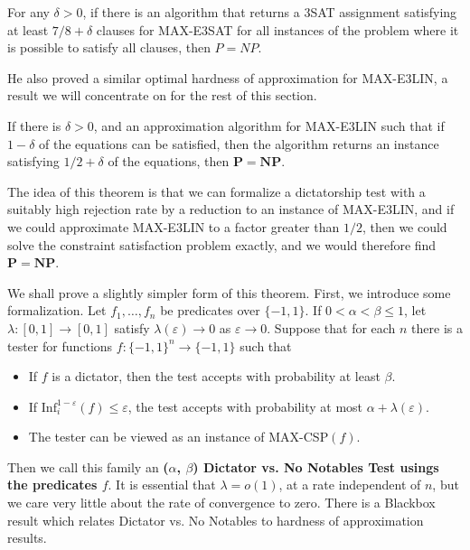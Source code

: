 \begin{theorem}[Hastad]
    For any $\delta > 0$, if there is an algorithm that returns a 3SAT assignment satisfying at least $7/8 + \delta$ clauses for MAX-E3SAT for all instances of the problem where it is possible to satisfy all clauses, then $P = NP$.
\end{theorem}

He also proved a similar optimal hardness of approximation for MAX-E3LIN, a result we will concentrate on for the rest of this section.

\begin{theorem}[Hastad]
    If there is $\delta > 0$, and an approximation algorithm for MAX-E3LIN such that if $1 - \delta$ of the equations can be satisfied, then the algorithm returns an instance satisfying $1/2 + \delta$ of the equations, then $\mathbf{P} = \mathbf{NP}$.
\end{theorem}

The idea of this theorem is that we can formalize a dictatorship test with a suitably high rejection rate by a reduction to an instance of MAX-E3LIN, and if we could approximate MAX-E3LIN to a factor greater than $1/2$, then we could solve the constraint satisfaction problem exactly, and we would therefore find $\mathbf{P} = \mathbf{NP}$.

We shall prove a slightly simpler form of this theorem. First, we introduce some formalization. Let $f_1, \dots, f_n$ be predicates over $\{ -1, 1 \}$. If $0 < \alpha < \beta \leq 1$, let $\lambda: [0,1] \to [0,1]$ satisfy $\lambda(\varepsilon) \to 0$ as $\varepsilon \to 0$. Suppose that for each $n$ there is a tester for functions $f: \{ -1, 1 \}^n \to \{ -1, 1 \}$ such that
%
\begin{itemize}
    \item If $f$ is a dictator, then the test accepts with probability at least $\beta$.
    \item If $\text{Inf}_i^{1 - \varepsilon}(f) \leq \varepsilon$, the test accepts with probability at most $\alpha + \lambda(\varepsilon)$.
    \item The tester can be viewed as an instance of MAX-CSP$(f)$.
\end{itemize}
%
Then we call this family an {\bf ($\alpha$, $\beta$) Dictator vs. No Notables Test usings the predicates $f$}. It is essential that $\lambda = o(1)$, at a rate independent of $n$, but we care very little about the rate of convergence to zero. There is a Blackbox result which relates Dictator vs. No Notables to hardness of approximation results.


